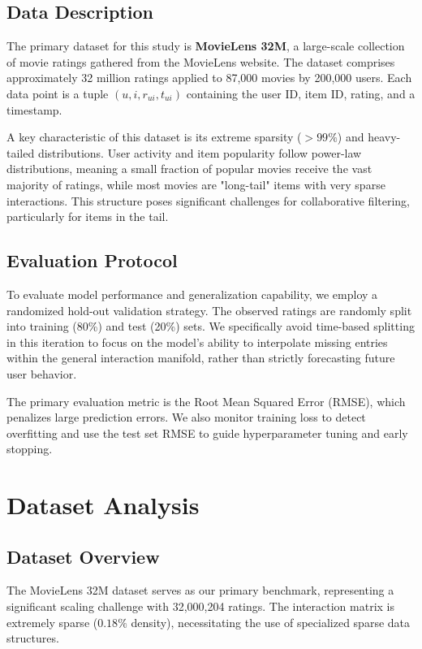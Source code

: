 \documentclass{article}
\theoremstyle{plain}
\theoremstyle{definition}
\theoremstyle{remark}
\begin{document}
\subsection{Data Description}
The primary dataset for this study is \textbf{MovieLens 32M}, a large-scale collection of movie ratings gathered from the MovieLens website. The dataset comprises approximately 32 million ratings applied to 87,000 movies by 200,000 users. Each data point is a tuple $(u, i, r_{ui}, t_{ui})$ containing the user ID, item ID, rating, and a timestamp.

A key characteristic of this dataset is its extreme sparsity ($>99\%$) and heavy-tailed distributions. User activity and item popularity follow power-law distributions, meaning a small fraction of popular movies receive the vast majority of ratings, while most movies are "long-tail" items with very sparse interactions. This structure poses significant challenges for collaborative filtering, particularly for items in the tail.

\subsection{Evaluation Protocol}
To evaluate model performance and generalization capability, we employ a randomized hold-out validation strategy. The observed ratings are randomly split into training (80\%) and test (20\%) sets. We specifically avoid time-based splitting in this iteration to focus on the model's ability to interpolate missing entries within the general interaction manifold, rather than strictly forecasting future user behavior.

The primary evaluation metric is the Root Mean Squared Error (RMSE), which penalizes large prediction errors. We also monitor training loss to detect overfitting and use the test set RMSE to guide hyperparameter tuning and early stopping.

\section{Dataset Analysis} %


\subsection{Dataset Overview}
The MovieLens 32M dataset serves as our primary benchmark, representing a significant scaling challenge with 32,000,204 ratings. The interaction matrix is extremely sparse ($0.18\%$ density), necessitating the use of specialized sparse data structures. 
\end{document}

